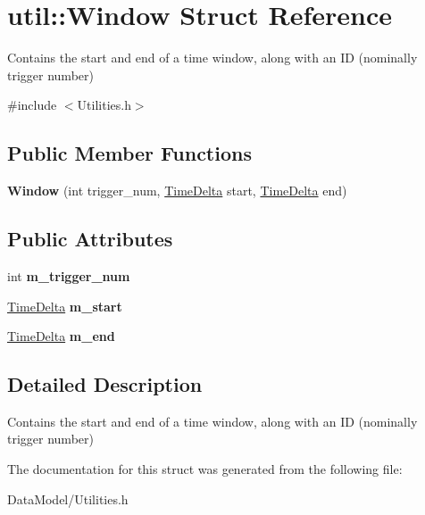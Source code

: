\hypertarget{structutil_1_1Window}{\section{util\-:\-:Window Struct Reference}
\label{structutil_1_1Window}
}


Contains the start and end of a time window, along with an I\-D (nominally trigger number)  




{\ttfamily \#include $<$Utilities.\-h$>$}

\subsection*{Public Member Functions}
\begin{DoxyCompactItemize}
\item 
\hypertarget{structutil_1_1Window_a8d07478c6ec86580a85651ff8aee7bbd}{{\bfseries Window} (int trigger\-\_\-num, \hyperlink{classTimeDelta}{Time\-Delta} start, \hyperlink{classTimeDelta}{Time\-Delta} end)}\label{structutil_1_1Window_a8d07478c6ec86580a85651ff8aee7bbd}

\end{DoxyCompactItemize}
\subsection*{Public Attributes}
\begin{DoxyCompactItemize}
\item 
\hypertarget{structutil_1_1Window_a0e08b9541333436563d90bedb5a05395}{int {\bfseries m\-\_\-trigger\-\_\-num}}\label{structutil_1_1Window_a0e08b9541333436563d90bedb5a05395}

\item 
\hypertarget{structutil_1_1Window_aa200771caef3a1a6bd46481a67739ca3}{\hyperlink{classTimeDelta}{Time\-Delta} {\bfseries m\-\_\-start}}\label{structutil_1_1Window_aa200771caef3a1a6bd46481a67739ca3}

\item 
\hypertarget{structutil_1_1Window_a396a04d14679767e54358145d933fc85}{\hyperlink{classTimeDelta}{Time\-Delta} {\bfseries m\-\_\-end}}\label{structutil_1_1Window_a396a04d14679767e54358145d933fc85}

\end{DoxyCompactItemize}


\subsection{Detailed Description}
Contains the start and end of a time window, along with an I\-D (nominally trigger number) 

The documentation for this struct was generated from the following file\-:\begin{DoxyCompactItemize}
\item 
Data\-Model/Utilities.\-h\end{DoxyCompactItemize}
